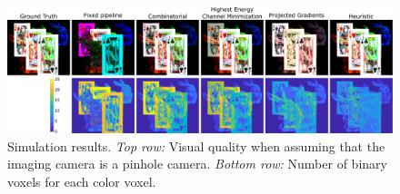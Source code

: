 \begin{figure}[h!]
\centering
\includegraphics[width=0.99\columnwidth]{images/volumetric/acd_exp9/exp_pinhole}
\caption[Adaptive color decomposition: pinhole-camera reconstruction and number of binary voxels]{Simulation results. \emph{Top row:} Visual quality when assuming that the imaging camera is a pinhole camera. \emph{Bottom row:} Number of binary voxels for each color voxel.}
\label{fig:volumetric:acd:exp9:pinhole}
\end{figure}

